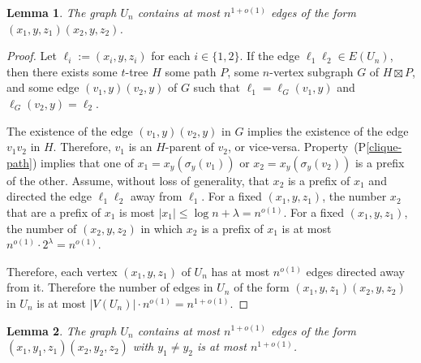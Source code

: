 \documentclass{patmorin}
\newcommand{\pref}[1]{(P\ref{#1})}
\newtheorem{lemma}{Lemma}
\begin{document}
\begin{lemma}\label{flat-edges}
    The graph $U_n$ contains at most $n^{1+o(1)}$ edges of the form $(x_1,y,z_1)(x_2,y,z_2)$.
\end{lemma}

\begin{proof}
    Let $\ell_i:=(x_i,y,z_i)$ for each $i\in\{1,2\}$.  If the edge $\ell_1\ell_2\in E(U_n)$, then there exists some $t$-tree $H$ some path $P$, some $n$-vertex subgraph $G$ of $H\boxtimes P$, and some edge $(v_1,y)(v_2,y)$ of $G$ such that $\ell_1=\ell_G(v_1,y)$ and $\ell_G(v_2,y)=\ell_2$.

    The existence of the edge $(v_1,y)(v_2,y)$ in $G$ implies the existence of the edge $v_1v_2$ in $H$.  Therefore, $v_1$ is an $H$-parent of $v_2$, or vice-versa. Property~\pref{clique-path} implies that one of $x_1=x_y(\sigma_y(v_1))$ or $x_2=x_y(\sigma_y(v_2))$ is a prefix of the other.  Assume, without loss of generality, that $x_2$ is a prefix of $x_1$ and directed the edge $\ell_1\ell_2$ away from $\ell_1$.  For a fixed $(x_1,y,z_1)$, the number $x_2$ that are a prefix of $x_1$ is most $|x_1|\le\log n+\lambda=n^{o(1)}$. For a fixed $(x_1,y,z_1)$, the number of $(x_2,y,z_2)$ in which $x_2$ is a prefix of $x_1$ is at most $n^{o(1)}\cdot 2^{\lambda}=n^{o(1)}$.

    Therefore, each vertex $(x_1,y,z_1)$ of $U_n$ has at most $n^{o(1)}$ edges directed away from it.  Therefore the number of edges in $U_n$ of the form $(x_1,y,z_1)(x_2,y,z_2)$ in $U_n$ is at most $|V(U_n)|\cdot n^{o(1)}=n^{1+o(1)}$.
\end{proof}

\begin{lemma}\label{vertical-edges}
    The graph $U_n$ contains at most $n^{1+o(1)}$ edges of the form $(x_1,y_1,z_1)(x_2,y_2,z_2)$ with $y_1\neq y_2$ is at most $n^{1+o(1)}$.
\end{lemma}
\end{document}
